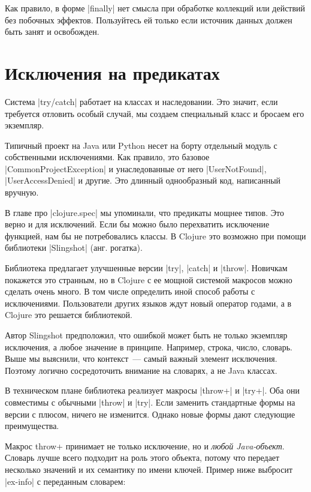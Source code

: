 Как правило, в форме \spverb|finally| нет смысла при обработке коллекций или действий
без побочных эффектов. Пользуйтесь ей только если источник данных должен быть
занят и освобожден.

\section{Исключения на предикатах}

Система \spverb|try/catch| работает на классах и наследовании. Это значит, если
требуется отловить особый случай, мы создаем специальный класс и бросаем его
экземпляр.

Типичный проект на Java или Python несет на борту отдельный модуль с
собственными исключениями. Как правило, это базовое \spverb|CommonProjectException| и
унаследованные от него \spverb|UserNotFound|, \spverb|UserAccessDenied| и другие. Это длинный
однообразный код, написанный вручную.

В главе про \spverb|clojure.spec| мы упоминали, что предикаты мощнее типов. Это верно и
для исключений. Если бы можно было перехватить исключение функцией, нам бы не
потребовались классы. В Clojure это возможно при помощи библиотеки \spverb|Slingshot|
(анг. рогатка).

Библиотека предлагает улучшенные версии \spverb|try|, \spverb|catch| и \spverb|throw|. Новичкам
покажется это странным, но в Clojure с ее мощной системой макросов можно сделать
очень много. В том числе определить иной способ работы с исключениями.
Пользователи других языков ждут новый оператор годами, а в Clojure это решается
библиотекой.

Автор Slingshot предположил, что ошибкой может быть не только экземпляр
исключения, а любое значение в принципе. Например, строка, число, словарь. Выше
мы выяснили, что контекст~--- самый важный элемент исключения. Поэтому логично
сосредоточить внимание на словарях, а не Java классах.

В техническом плане библиотека реализует макросы \spverb|throw+| и \spverb|try+|. Оба они
совместимы с обычными \spverb|throw| и \spverb|try|. Если заменить стандартные формы на версии
с плюсом, ничего не изменится. Однако новые формы дают следующие преимущества.

Макрос throw+ принимает не только исключение, но и \emph{любой
Java-объект}. Словарь лучше всего подходит на роль этого объекта, потому что
передает несколько значений и их семантику по имени ключей. Пример ниже выбросит
\spverb|ex-info| с переданным словарем:

